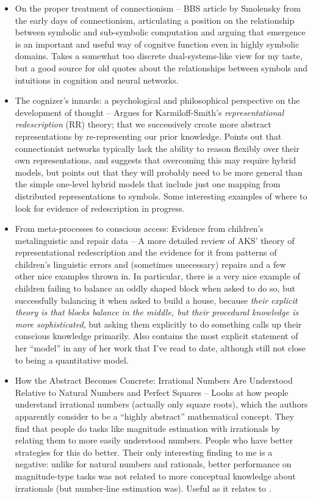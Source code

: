 \documentclass[11pt]{article}
\begin{document}
\begin{itemize}
\item On the proper treatment of connectionism -- BBS article by Smolensky from the early days of connectionism, articulating a position on the relationship between symbolic and sub-symbolic computation and arguing that emergence is an important and useful way of cognitve function even in highly symbolic domains. Takes a somewhat too discrete dual-systems-like view for my taste, but a good source for old quotes about the relationships between symbols and intuitions in cognition and neural networks. \citep{Smolensky1988}
\item The cognizer's innards: a psychological and philosophical perspective on the development of thought -- Argues for Karmiloff-Smith's \emph{representational redescription} (RR) theory; that we successively create more abstract representations by re-representing our prior knowledge. Points out that connectionist networks typically lack the ability to reason flexibly over their own representations, and suggests that overcoming this may require hybrid models, but points out that they will probably need to be more general than the simple one-level hybrid models that include just one mapping from distributed representations to symbols. Some interesting examples of where to look for evidence of redescription in progress. \citep{Clark1993}
\item From meta-processes to conscious access: Evidence from children's metalinguistic and repair data -- A more detailed review of AKS' theory of representational redescription and the evidence for it from patterns of children's linguistic errors and (sometimes unecessary) repairs and a few other nice examples thrown in. In particular, there is a very nice example of children failing to balance an oddly shaped block when asked to do so, but successfully balancing it when asked to build a house, because \emph{their explicit theory is that blocks balance in the middle, but their procedural knowledge is more sophisticated}, but asking them explicitly to do something calls up their conscious knowledge primarily. Also contains the most explicit statement of her ``model'' in any of her work that I've read to date, although still not close to being a quantitative model. \citep{Karmiloff-Smith1986}
\item How the Abstract Becomes Concrete: Irrational Numbers Are Understood Relative to Natural Numbers and Perfect Squares -- Looks at how people understand irrational numbers (actually only square roots), which the authors apparently consider to be a ``highly abstract'' mathematical concept. They find that people do tasks like magnitude estimation with irrationals by relating them to more easily understood numbers. People who have better strategies for this do better. Their only interesting finding to me is a negative: unlike for natural numbers and rationals, better performance on magnitude-type tasks was not related to more conceptual knowledge about irrationals (but number-line estimation was). Useful as it relates to \citep{Wilensky1991}. 

\end{itemize}
\end{document}
